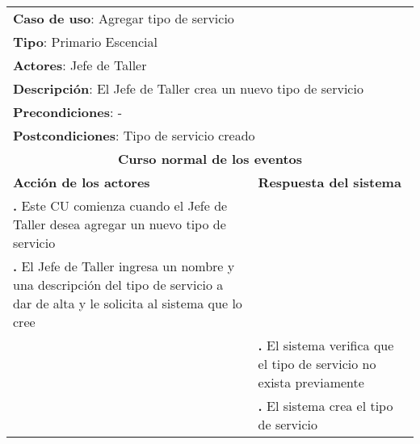 \documentclass[12pt]{extarticle}
\begin{document}
    \newcommand\inc{\stepcounter{step}\textbf{\thestep. }}
    \newcommand\resetinc{\setcounter{step}{0}}
    \newcommand\raya{\noindent\rule{169mm}{0.8mm}\\}


	\begin{longtable}{ |p{8cm}|p{8cm}| }
		\hline
		\multicolumn{2}{|p{16cm}|}{\textbf{Caso de uso}: Agregar tipo de servicio}\\
		\multicolumn{2}{|p{16cm}|}{\textbf{Tipo}: Primario Escencial}\\
		\multicolumn{2}{|p{16cm}|}{\textbf{Actores}: Jefe de Taller}\\
		\multicolumn{2}{|p{16cm}|}{\textbf{Descripción}: El Jefe de Taller crea un nuevo tipo de servicio}\\
		\multicolumn{2}{|p{16cm}|}{\textbf{Precondiciones}: -}\\
		\multicolumn{2}{|p{16cm}|}{\textbf{Postcondiciones}: Tipo de servicio creado}\\
		\hline
		\multicolumn{2}{|c|}{\textbf{Curso normal de los eventos}}\\
		\hline
		\textbf{Acción de los actores} & \textbf{Respuesta del sistema}\\
		\hline
			\inc Este CU comienza cuando el Jefe de Taller desea agregar un nuevo tipo de servicio & \\
			\hline
            \inc  El Jefe de Taller ingresa un nombre y una descripción del tipo de servicio a dar de alta y le solicita al sistema que lo cree & \\
			\hline
            & \inc El sistema verifica que el tipo de servicio no exista previamente \\
			\hline
			& \inc El sistema crea el tipo de servicio \\
			\hline



\end{longtable}
\end{document}
